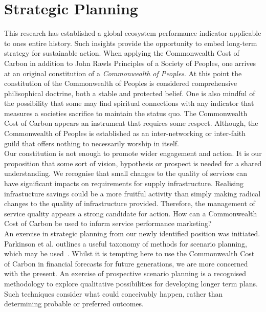 \documentclass[12pt, oneside]{article}   	%
\begin{document}
\section{Strategic Planning}

This research has established a global ecosystem performance indicator applicable to ones entire history.
Such insights provide the opportunity to embed long-term strategy for sustainable action.
When applying the Commonwealth Cost of Carbon in addition to John Rawls Principles of a Society of Peoples, one arrives at an original constitution of a \emph{Commonwealth of Peoples}.
At this point the constitution of the Commonwealth of Peoples is considered comprehensive philisophical doctrine, both a stable and protected belief.
One is also mindful of the possibility that some may find spiritual connections with any indicator that measures a societies sacrifice to maintain the status quo.
The Commonwealth Cost of Carbon appears an instrument that requires some respect.
Although, the Commonwealth of Peoples is established as an inter-networking or inter-faith guild that offers nothing to necessarily worship in itself.\\

Our constitution is not enough to promote wider engagement and action.
It is our proposition that some sort of vision, hypothesis or prospect is needed for a shared understanding.
We recognise that small changes to the quality of services can have significant impacts on requirements for supply infrastructure.
Realising infrastucture savings could be a more fruitful activity than simply making radical changes to the quality of infrastructure provided.
Therefore, the management of service quality appears a strong candidate for action.
How can a Commonwealth Cost of Carbon be used to inform service performance marketing?\\

An exercise in strategic planning from our newly identified position was initiated.
Parkinson et al. outlines a useful taxonomy of methods for scenario planning, which may be used~\cite{atp1}.
Whilst it is tempting here to use the Commonwealth Cost of Carbon in financial forecasts for future generations, we are more concerned with the present.
An exercise of prospective scenario planning is a recognised methodology to explore qualitative possibilities for developing longer term plans.
Such techniques consider what could conceivably happen, rather than determining probable or preferred outcomes.\\
\end{document}
